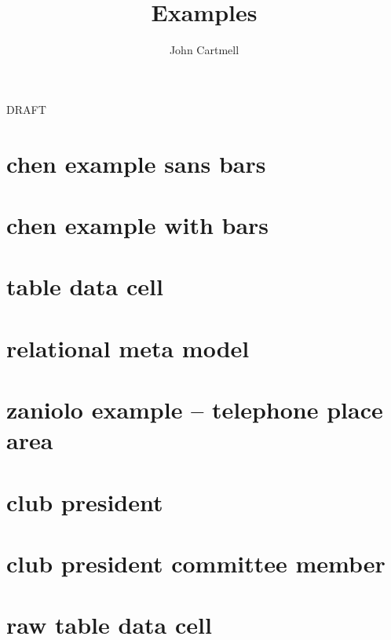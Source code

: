 \documentclass[10pt,a4paper]{article}
\begin{document}
\title{Examples}


\author{John Cartmell}

\maketitle
\begin{center}
DRAFT
\end{center}

\section{chen example sans bars}


\section{chen example with bars}


\section{table data cell}


\section{relational meta model}




\section{zaniolo example -- telephone place area}


\section{club president}


\section{club president committee member}


\section{raw table data cell}

\end{document}
